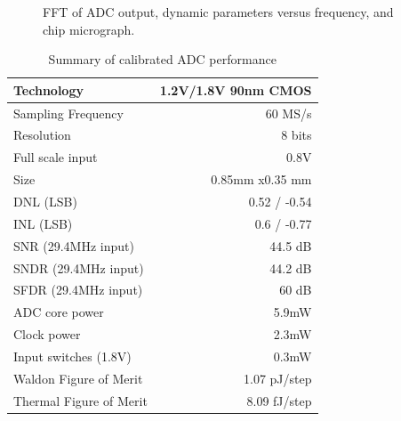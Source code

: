 \begin{figure}[htbp]
\begin{centering}
   \caption{FFT of ADC output, dynamic parameters versus frequency,
     and chip micrograph.}
 \end{centering}
\end{figure}









\begin{table}[htbp]
\centering
\renewcommand{\arraystretch}{1.3}
\caption{ Summary of calibrated ADC performance  }
\label{cbsctab:summary}
\begin{tabular}{l|r}
Technology & 1.2V/1.8V 90nm CMOS\\
\hline
Sampling Frequency & 60 MS/s\\
\hline
Resolution & 8 bits \\
\hline
Full scale input & 0.8V \\
\hline
Size & 0.85mm x0.35 mm\\
\hline
DNL (LSB)& 0.52 / -0.54\\
\hline
INL (LSB)& 0.6 / -0.77\\
\hline
SNR (29.4MHz input) & 44.5 dB\\
\hline
SNDR (29.4MHz input) & 44.2 dB\\
\hline
SFDR (29.4MHz input) & 60 dB\\
\hline
ADC core power & 5.9mW\\
\hline
Clock power & 2.3mW\\
\hline
Input switches (1.8V) & 0.3mW\\
\hline
Waldon Figure of Merit & 1.07 pJ/step\\
\hline
Thermal Figure of Merit & 8.09 fJ/step\\
\hline
\end{tabular} 
\end{table}




